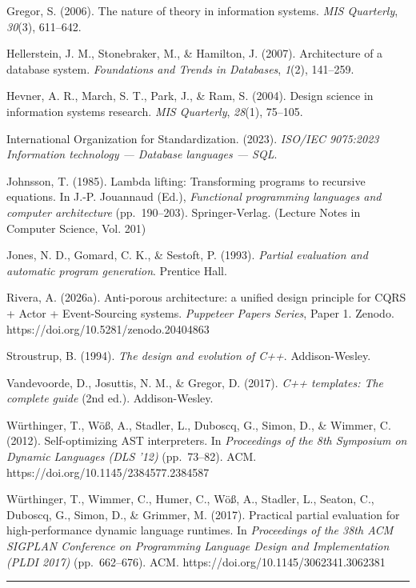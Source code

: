 \documentclass[
]{article}
\begin{document}
Gregor, S. (2006). The nature of theory in information systems.
\emph{MIS Quarterly}, \emph{30}(3), 611--642.

Hellerstein, J. M., Stonebraker, M., \& Hamilton, J. (2007).
Architecture of a database system. \emph{Foundations and Trends in
Databases}, \emph{1}(2), 141--259.

Hevner, A. R., March, S. T., Park, J., \& Ram, S. (2004). Design science
in information systems research. \emph{MIS Quarterly}, \emph{28}(1),
75--105.

International Organization for Standardization. (2023). \emph{ISO/IEC
9075:2023 Information technology --- Database languages --- SQL}.

Johnsson, T. (1985). Lambda lifting: Transforming programs to recursive
equations. In J.-P. Jouannaud (Ed.), \emph{Functional programming
languages and computer architecture} (pp.~190--203). Springer-Verlag.
(Lecture Notes in Computer Science, Vol. 201)

Jones, N. D., Gomard, C. K., \& Sestoft, P. (1993). \emph{Partial
evaluation and automatic program generation}. Prentice Hall.

Rivera, A. (2026a). Anti-porous architecture: a unified design principle
for CQRS + Actor + Event-Sourcing systems. \emph{Puppeteer Papers
Series}, Paper 1. Zenodo. https://doi.org/10.5281/zenodo.20404863

Stroustrup, B. (1994). \emph{The design and evolution of C++}.
Addison-Wesley.

Vandevoorde, D., Josuttis, N. M., \& Gregor, D. (2017). \emph{C++
templates: The complete guide} (2nd ed.). Addison-Wesley.

Würthinger, T., Wöß, A., Stadler, L., Duboscq, G., Simon, D., \& Wimmer,
C. (2012). Self-optimizing AST interpreters. In \emph{Proceedings of the
8th Symposium on Dynamic Languages (DLS '12)} (pp.~73--82). ACM.
https://doi.org/10.1145/2384577.2384587

Würthinger, T., Wimmer, C., Humer, C., Wöß, A., Stadler, L., Seaton, C.,
Duboscq, G., Simon, D., \& Grimmer, M. (2017). Practical partial
evaluation for high-performance dynamic language runtimes. In
\emph{Proceedings of the 38th ACM SIGPLAN Conference on Programming
Language Design and Implementation (PLDI 2017)} (pp.~662--676). ACM.
https://doi.org/10.1145/3062341.3062381

\begin{center}\rule{0.5\linewidth}{0.5pt}\end{center}
\end{document}
